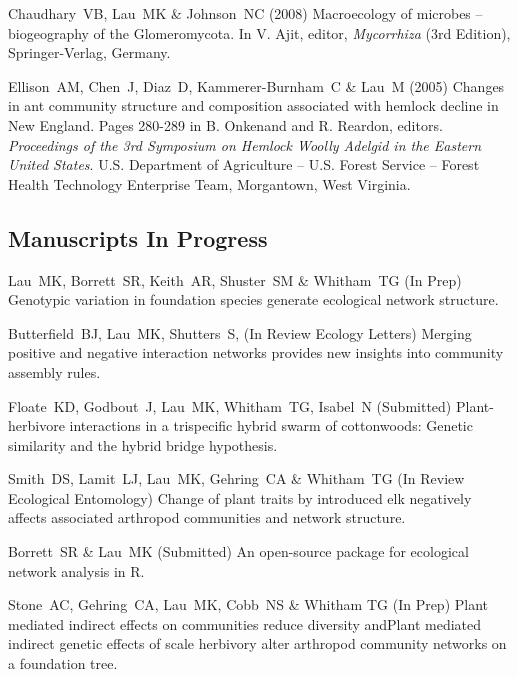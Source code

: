 \documentclass[letterpaper]{article}
\renewenvironment{itemize}{
  \begin{list}{}{
    \setlength{\leftmargin}{1em}
  }
}{
  \end{list}
}
\begin{document}
\begin{itemize}
\item Chaudhary\ VB, Lau\ MK \& Johnson\ NC (2008) Macroecology of
  microbes -- biogeography of the Glomeromycota. In V. Ajit, editor,
  \textit{Mycorrhiza} (3rd Edition), Springer-Verlag, Germany.

\item Ellison\ AM, Chen\ J, Diaz\ D, Kammerer-Burnham\ C \& Lau\ M
  (2005) Changes in ant community structure and composition associated
  with hemlock decline in New England. Pages 280-289 in B. Onkenand
  and R. Reardon, editors. \textit{Proceedings of the 3rd Symposium on
    Hemlock Woolly Adelgid in the Eastern United
    States}. U.S. Department of Agriculture -- U.S. Forest Service --
  Forest Health Technology Enterprise Team, Morgantown, West
  Virginia. 

\subsection{Manuscripts In Progress}

\begin{itemize}

\item Lau\ MK, Borrett\ SR, Keith\ AR, Shuster\ SM \& Whitham\ TG (In
  Prep) Genotypic variation in foundation species generate ecological
  network structure. 

\item Butterfield\ BJ, Lau\ MK, Shutters\ S, (In Review Ecology
  Letters) Merging positive and negative interaction networks provides
  new insights into community assembly rules.

\item Floate\ KD, Godbout\ J, Lau\ MK, Whitham\ TG, Isabel\ N
  (Submitted) Plant-herbivore interactions in a trispecific hybrid swarm of
  cottonwoods:  Genetic similarity and the hybrid bridge hypothesis.

\item Smith\ DS, Lamit\ LJ, Lau\ MK, Gehring\ CA \& Whitham\ TG
  (In Review Ecological Entomology) Change of plant traits by
  introduced elk negatively affects associated arthropod communities
  and network structure.

\item Borrett\ SR \& Lau\ MK (Submitted) An open-source package for
  ecological network analysis in R.

\item Stone\ AC, Gehring\ CA, Lau\ MK, Cobb\ NS \& Whitham TG
  (In Prep) Plant mediated indirect effects on communities reduce
  diversity andPlant mediated indirect genetic effects of scale
  herbivory alter arthropod community networks on a foundation tree.

\end{itemize}

\end{itemize}
\end{document}
